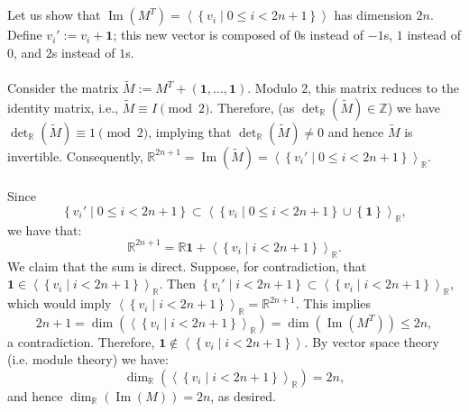 \begin{solution}
    \\\\
    Let us show that \( \operatorname{Im}\left(M^T\right) = \left\langle \left\{ v_i \mid 0\leq i < 2n+1 \right\} \right\rangle \) has dimension \( 2n \). Define \( v_i' := v_i + \mathbf{1} \); this new vector is composed of \( 0 \)s instead of \( -1 \)s, \( 1 \) instead of \( 0 \), and \( 2 \)s instead of \( 1 \)s.
    \\\\
    Consider the matrix \( \tilde{M} := M^T + \left( \mathbf{1}, \ldots, \mathbf{1} \right) \). Modulo \( 2 \), this matrix reduces to the identity matrix, i.e., \( \tilde{M} \equiv I \pmod{2} \). Therefore, (as \( \det_{\mathbb{R}}\left(\tilde{M}\right)\in\mathbb{Z} \)) we have \( \det_{\mathbb{R}}\left(\tilde{M}\right) \equiv 1 \pmod{2} \), implying that \( \det_{\mathbb{R}}\left(\tilde{M}\right) \neq 0 \) and hence \( \tilde{M} \) is invertible. Consequently, \( \mathbb{R}^{2n+1} = \operatorname{Im}\left(\tilde{M}\right) = \left\langle \left\{ v_i' \mid 0\leq i < 2n+1 \right\} \right\rangle_{\mathbb{R}} \).
    \\\\
    Since
    \[
        \left\{ v_i' \mid 0\leq i < 2n+1 \right\} \subset \left\langle \left\{ v_i \mid 0\leq i < 2n+1 \right\} \cup \left\{ \mathbf{1} \right\} \right\rangle_{\mathbb{R}},
    \]
    we have that:
    \[
        \mathbb{R}^{2n+1} = \mathbb{R} \mathbf{1} + \left\langle \left\{ v_i \mid i < 2n+1 \right\} \right\rangle_{\mathbb{R}}.
    \]
    We claim that the sum is direct. Suppose, for contradiction, that \( \mathbf{1} \in \left\langle \left\{ v_i \mid i < 2n+1 \right\} \right\rangle_{\mathbb{R}} \). Then \( \left\{ v_i' \mid i < 2n+1 \right\} \subset \left\langle \left\{ v_i \mid i < 2n+1 \right\} \right\rangle_{\mathbb{R}} \), which would imply \( \left\langle \left\{ v_i \mid i < 2n+1 \right\} \right\rangle_{\mathbb{R}} = \mathbb{R}^{2n+1} \). This implies
    \[
        2n+1 = \dim\left( \left\langle \left\{ v_i \mid i < 2n+1 \right\} \right\rangle_{\mathbb{R}}\right) = \dim\left( \operatorname{Im}\left(M^T\right) \right) \leq 2n,
    \]
    a contradiction. Therefore, \( \mathbf{1} \notin \left\langle \left\{ v_i \mid i < 2n+1 \right\} \right\rangle \). By vector space theory (i.e. module theory) we have:
    \[
        \dim_{\mathbb{R}}\left( \left\langle \left\{ v_i \mid i < 2n+1 \right\}\right\rangle_{\mathbb{R}}\right) = 2n,
    \]
    and hence \( \dim_{\mathbb{R}}\left( \operatorname{Im}\left(M\right) \right) = 2n \), as desired.
    \\\\

\end{solution}
